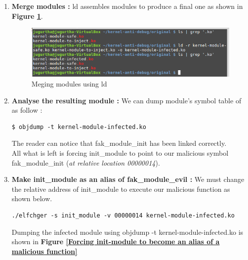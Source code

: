 \begin{enumerate}
	\item \textbf{Merge modules : } ld assembles modules to produce a final one as shown in \textbf{Figure \ref{Meging modules using ld}}.
    		\begin{figure}[H]
					\centering
        			\includegraphics[scale=0.45]{img/solution/combining-modules-linux.png}
        			\caption{Meging modules using ld}
        			\label{Meging modules using ld}
   			 \end{figure}	
	
	
	
	\item \textbf{Analyse the resulting module :} We can dump module's symbol table of as follow :
\begin{lstlisting}[style=BashInputStyle]
$ objdump -t kernel-module-infected.ko
\end{lstlisting}

The reader can notice that \og fak\_module\_init \fg has been linked correctly.\\
All what is left is forcing \og init\_module \fg to point to our malicious symbol \og fak\_module\_init \fg (\emph{at relative location 00000014}).

\item \textbf{Make init\_module as an alias of fak\_module\_evil : } We must change the relative address of init\_module to execute our malicious function as shown below.
\begin{lstlisting}[style=BashInputStyle]
./elfchger -s init_module -v 00000014 kernel-module-infected.ko
\end{lstlisting}

Dumping the infected module using \og objdump -t kernel-module-infected.ko \fg is shown in \textbf{Figure \ref{Forcing init-module to become an alias of a malicious function}}


\end{enumerate}
